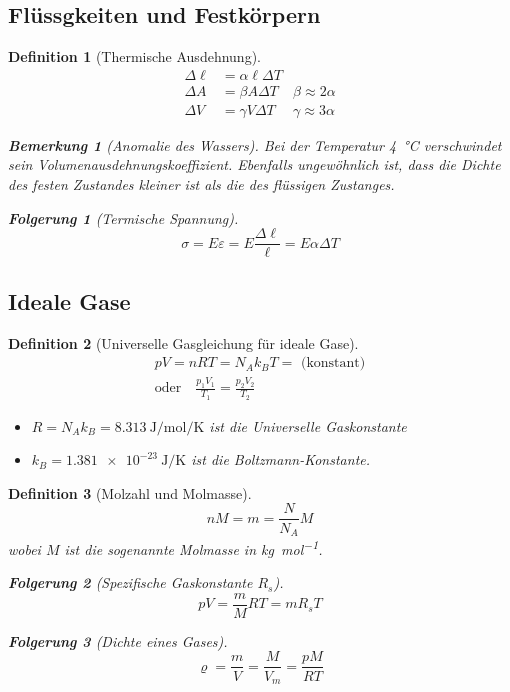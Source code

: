 \documentclass[a4paper, twocolumn]{article}
\numberwithin{equation}{section}
\theoremstyle{hsr-def}
\newtheorem{definition}{Definition}[section]
\theoremstyle{hsr-sub}
\newtheorem{result}{Folgerung}[definition]
\newtheorem{remark}{Bemerkung}[definition]
\begin{document}
\subsection{Fl\"ussgkeiten und Festk\"orpern}
\begin{definition}[Thermische Ausdehnung]
\begin{align*}
    \Delta \ell &= \alpha\ell\Delta T \\
    \Delta A &= \beta A \Delta T & \beta \approx 2\alpha \\
    \Delta V &= \gamma V \Delta T & \gamma \approx 3\alpha
\end{align*}

\begin{remark}[Anomalie des Wassers] Bei der Temperatur \SI{4}{\celsius} verschwindet sein Volumenausdehnungskoeffizient. Ebenfalls ungew\"ohnlich ist, dass die Dichte des festen Zustandes kleiner ist als die des fl\"ussigen Zustanges.
\end{remark}

\begin{result}[Termische Spannung]
\[
    \sigma = E\varepsilon = E\frac{\Delta \ell}{\ell} = E \alpha \Delta T
\]
\end{result}
\end{definition}

\subsection{Ideale Gase}
\begin{definition}[Universelle Gasgleichung f\"ur ideale Gase]
\begin{gather*}
    pV = nRT = N_A k_B T = \text{ (konstant)} \\
    \text{oder} \quad \frac{p_1 V_1}{T_1} = \frac{p_2 V_2}{T_2}
\end{gather*}
\begin{itemize}
    \item \(R = N_A k_B = \SI{8.313}{\joule\per\mole\per\kelvin}\) ist die Universelle Gaskonstante
    \item \(k_B = \SI{1.381e-23}{\joule\per\kelvin}\) ist die Boltzmann-Konstante.
\end{itemize}
\end{definition}

\begin{definition}[Molzahl und Molmasse]
\[
    nM = m = \frac{N}{N_A} M
\]
wobei \(M\) ist die sogenannte Molmasse in \si{\kilo\gram\per\mole}.

\begin{result}[Spezifische Gaskonstante \(R_s\)]
\[
    pV = \frac{m}{M} RT = m R_s T
\]
\end{result}

\begin{result}[Dichte eines Gases]
\[
    \varrho = \frac{m}{V} = \frac{M}{V_m} = \frac{pM}{RT}
\]
\end{result}
\end{definition}
\end{document}
